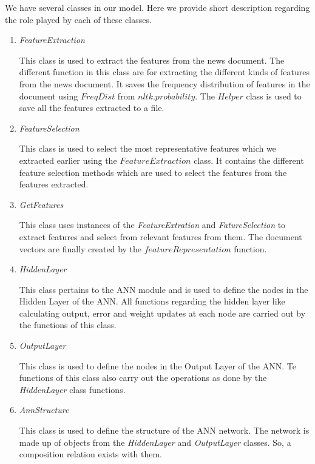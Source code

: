 \documentclass[a4paper,12bp]{report}
\begin{document}
We have several classes in our model. Here we provide short description regarding the role played by each of these classes.

\begin{enumerate}
\item \textit{FeatureExtraction}

This class is used to extract the features from the news document. The different function in this class are for extracting the different kinds of features from the news document. It saves the frequency distribution of features in the document using $FreqDist$  from $nltk.probability$. The $Helper$ class is used to save all the features extracted to a file. 

\item \textit{FeatureSelection}

This class is used to select the most representative features which we extracted earlier using the $FeatureExtraction$ class. It contains the different feature selection methods which are used to select the features from the features extracted. 

\item \textit{GetFeatures}

This class uses instances of the \textit{FeatureExtration} and \textit{FatureSelection} to extract features and select from relevant features from them. The document vectors are finally created by the $featureRepresentation$ function. 

\item \textit{HiddenLayer}

This class pertains to the ANN module and is used to define the nodes in the Hidden Layer of the ANN. All functions regarding the hidden layer like calculating output, error and weight updates at each node are carried out by the functions of this class. 

\item \textit{OutputLayer}

This class is used to define the nodes in the Output Layer of the ANN. Te functions of this class also carry out the operations as done by the \textit{HiddenLayer} class functions. 

\item \textit{AnnStructure}

This class is used to define the structure of the ANN network. The network is made up of objects from the \textit{HiddenLayer} and \textit{OutputLayer} classes. So, a composition relation exists with them. 


\end{enumerate}
\end{document}
